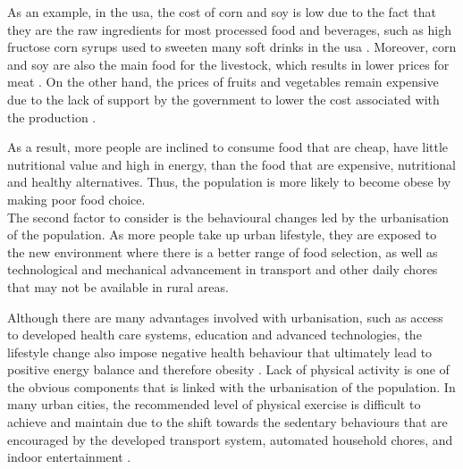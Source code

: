 As an example, in the \gls{usa}, the cost of corn and soy is low due to the fact that they are the raw ingredients for most processed food and beverages, such as high fructose corn syrups used to sweeten many soft drinks in the \gls{usa} \citep{Malik2013}.
Moreover, corn and soy are also the main food for the livestock, which results in lower prices for meat \citep{Malik2013}.
On the other hand, the prices of fruits and vegetables remain expensive due to the lack of support by the government to lower the cost associated with the production \citep{Malik2013}.

As a result, more people are inclined to consume food that are cheap, have little nutritional value and high in energy, than the food that are expensive, nutritional and healthy alternatives.
Thus, the population is more likely to become obese by making poor food choice.\\

\noindent
The second factor to consider is the behavioural changes led by the urbanisation of the population.
As more people take up urban lifestyle, they are exposed to the new environment where there is a better range of food selection, as well as technological and mechanical advancement in transport and other daily chores that may not be available in rural areas.

Although there are many advantages involved with urbanisation, such as access to developed health care systems, education and advanced technologies, the lifestyle change also impose negative health behaviour that ultimately lead to positive energy balance and therefore obesity \citep{Malik2013}.
Lack of physical activity is one of the obvious components that is linked with the urbanisation of the population.
In many urban cities, the recommended level of physical exercise is difficult to achieve and maintain due to the shift towards the sedentary behaviours that are encouraged by the developed transport system, automated household chores, and indoor entertainment \citep{Malik2013}.
\\

